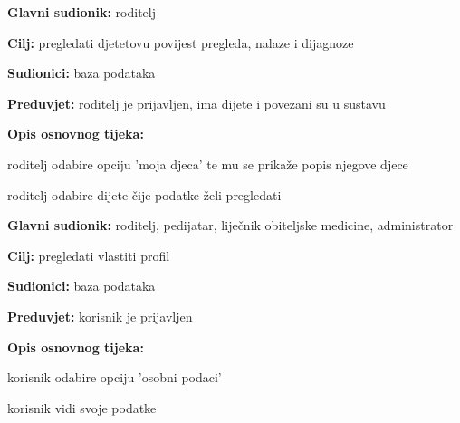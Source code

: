                     \noindent {}
					\begin{packed_item}
	
						\item \textbf{Glavni sudionik: }roditelj
						\item  \textbf{Cilj:} pregledati djetetovu povijest pregleda, nalaze i dijagnoze
						\item  \textbf{Sudionici:} baza podataka
						\item  \textbf{Preduvjet:} roditelj je prijavljen, ima dijete i povezani su u sustavu
						\item  \textbf{Opis osnovnog tijeka:}
						
						\item[] \begin{packed_enum}
	
							\item roditelj odabire opciju 'moja djeca' te mu se prikaže popis njegove djece
							\item roditelj odabire dijete čije podatke želi pregledati
							
						\end{packed_enum}
						
					\end{packed_item}

                    
                    \noindent {}
					\begin{packed_item}
	
						\item \textbf{Glavni sudionik: }roditelj, pedijatar, liječnik obiteljske medicine, administrator
						\item  \textbf{Cilj:} pregledati vlastiti profil
						\item  \textbf{Sudionici:} baza podataka
						\item  \textbf{Preduvjet:} korisnik je prijavljen 
						\item  \textbf{Opis osnovnog tijeka:}
						
						\item[] \begin{packed_enum}
	
							\item korisnik odabire opciju 'osobni podaci'
							\item korisnik vidi svoje podatke
							
						\end{packed_enum}
						
					\end{packed_item}


